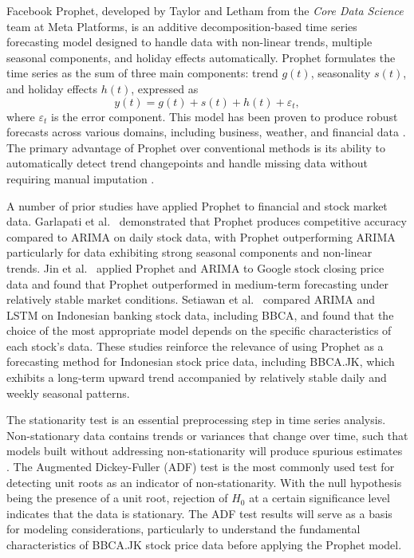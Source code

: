 \documentclass[11pt,twoside]{article}
\begin{document}
Facebook Prophet, developed by Taylor and Letham \cite{Taylor2018} from the \textit{Core Data Science} team at Meta Platforms, is an additive decomposition-based time series forecasting model designed to handle data with non-linear trends, multiple seasonal components, and holiday effects automatically. Prophet formulates the time series as the sum of three main components: trend $g(t)$, seasonality $s(t)$, and holiday effects $h(t)$, expressed as
\begin{equation*}
    y(t) = g(t) + s(t) + h(t) + \varepsilon_t,
\end{equation*}
where $\varepsilon_t$ is the error component. This model has been proven to produce robust forecasts across various domains, including business, weather, and financial data \cite{Taylor2018}. The primary advantage of Prophet over conventional methods is its ability to automatically detect trend changepoints and handle missing data without requiring manual imputation \cite{Taylor2018}.

A number of prior studies have applied Prophet to financial and stock market data. Garlapati et al.\ \cite{Garlapati2021} demonstrated that Prophet produces competitive accuracy compared to ARIMA on daily stock data, with Prophet outperforming ARIMA particularly for data exhibiting strong seasonal components and non-linear trends. Jin et al.\ \cite{Jin2022} applied Prophet and ARIMA to Google stock closing price data and found that Prophet outperformed in medium-term forecasting under relatively stable market conditions. Setiawan et al.\ \cite{Setiawan2023} compared ARIMA and LSTM on Indonesian banking stock data, including BBCA, and found that the choice of the most appropriate model depends on the specific characteristics of each stock's data. These studies reinforce the relevance of using Prophet as a forecasting method for Indonesian stock price data, including BBCA.JK, which exhibits a long-term upward trend accompanied by relatively stable daily and weekly seasonal patterns.

The stationarity test is an essential preprocessing step in time series analysis. Non-stationary data contains trends or variances that change over time, such that models built without addressing non-stationarity will produce spurious estimates \cite{Granger1974}. The Augmented Dickey-Fuller (ADF) test \cite{Dickey1979} is the most commonly used test for detecting unit roots as an indicator of non-stationarity. With the null hypothesis being the presence of a unit root, rejection of $H_0$ at a certain significance level indicates that the data is stationary. The ADF test results will serve as a basis for modeling considerations, particularly to understand the fundamental characteristics of BBCA.JK stock price data before applying the Prophet model.
\end{document}
